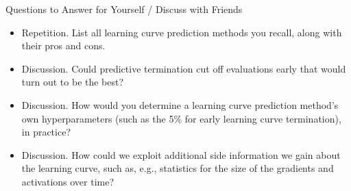 \begin{frame}[c]{Questions to Answer for Yourself / Discuss with Friends}

\begin{itemize}
    \item \alert{Repetition.} List all learning curve prediction methods you recall, along with their pros and cons.
\medskip
    \item \alert{Discussion.} Could predictive termination cut off evaluations early that would turn out to be the best?
\medskip
    \item \alert{Discussion.} How would you determine a learning curve prediction method's own hyperparameters (such as the 5\% for early learning curve termination), in practice?
\medskip
    \item \alert{Discussion.} How could we exploit additional side information we gain about the learning curve, such as, e.g., statistics for the size of the gradients and activations over time?
\end{itemize}

\end{frame}

